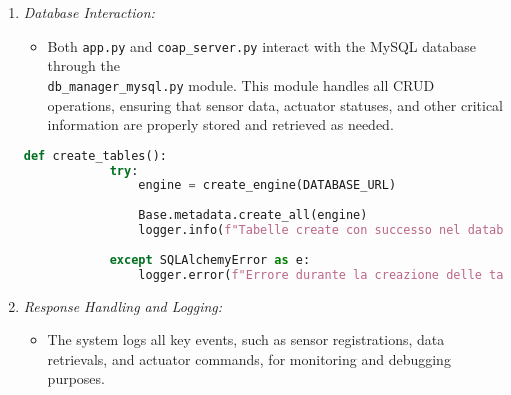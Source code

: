 \begin{enumerate}
    \item \textit{Database Interaction:}
          \begin{itemize}
              \item Both \texttt{app.py} and \texttt{coap\_server.py} interact with the MySQL database through the\\
                    \texttt{db\_manager\_mysql.py} module. This module handles all CRUD operations, ensuring that sensor data, actuator statuses, and other critical information are properly stored and retrieved as needed.
          \end{itemize}
          \begin{lstlisting}[language=Python]
        def create_tables():
            try:
                engine = create_engine(DATABASE_URL)
        
                Base.metadata.create_all(engine)
                logger.info(f"Tabelle create con successo nel database '{engine.url.database}'.")
        
            except SQLAlchemyError as e:
                logger.error(f"Errore durante la creazione delle tabelle: {str(e)}")


        \end{lstlisting}

    \item \textit{Response Handling and Logging:}
          \begin{itemize}
              \item The system logs all key events, such as sensor registrations, data retrievals, and actuator commands, for monitoring and debugging purposes.
          \end{itemize}
\end{enumerate}

